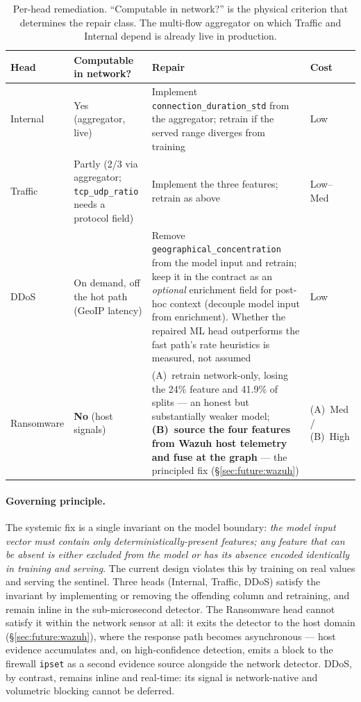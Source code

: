 \begin{table}[h]
    \centering
    \footnotesize
    \caption{Per-head remediation. ``Computable in network?'' is the physical
    criterion that determines the repair class. The multi-flow aggregator on
    which Traffic and Internal depend is already live in production.}
    \label{tab:remediation}
    \begin{tabular}{lp{3.1cm}p{4.7cm}l}
        \toprule
        \textbf{Head} & \textbf{Computable in network?} & \textbf{Repair} & \textbf{Cost} \\
        \midrule
        Internal & Yes (aggregator, live) &
        Implement \texttt{connection\_duration\_std} from the aggregator; retrain if
        the served range diverges from training & Low \\
        \addlinespace
        Traffic & Partly (2/3 via aggregator; \texttt{tcp\_udp\_ratio} needs a
        protocol field) & Implement the three features; retrain as above & Low--Med \\
        \addlinespace
        DDoS & On demand, off the hot path (GeoIP latency) &
        Remove \texttt{geographical\_concentration} from the model input and retrain;
        keep it in the contract as an \emph{optional} enrichment field for post-hoc
        context (decouple model input from enrichment). Whether the repaired ML head
        outperforms the fast path's rate heuristics is measured, not assumed & Low \\
        \addlinespace
        Ransomware & \textbf{No} (host signals) &
        (A)~retrain network-only, losing the 24\% feature and 41.9\% of splits ---
        an honest but substantially weaker model; \textbf{(B)~source the four
        features from Wazuh host telemetry and fuse at the graph} --- the principled
        fix (\S\ref{sec:future:wazuh}) & (A)~Med / (B)~High \\
        \bottomrule
    \end{tabular}
\end{table}

\paragraph{Governing principle.}
The systemic fix is a single invariant on the model boundary: \emph{the model
input vector must contain only deterministically-present features; any feature
that can be absent is either excluded from the model or has its absence encoded
identically in training and serving}. The current design violates this by
training on real values and serving the sentinel. Three heads (Internal, Traffic,
DDoS) satisfy the invariant by implementing or removing the offending column and
retraining, and remain inline in the sub-microsecond detector. The Ransomware
head cannot satisfy it within the network sensor at all: it exits the detector to
the host domain (\S\ref{sec:future:wazuh}), where the response path becomes
asynchronous --- host evidence accumulates and, on high-confidence detection,
emits a block to the firewall \texttt{ipset} as a second evidence source
alongside the network detector. DDoS, by contrast, remains inline and real-time:
its signal is network-native and volumetric blocking cannot be deferred.



